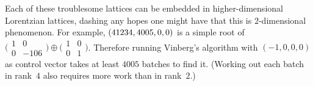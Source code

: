 \documentclass[12pt]{amsart}
\def\twobytwo#1#2#3#4{\bigl(\begin{smallmatrix}#1&#2\\#3&#4\end{smallmatrix}\bigr)
    }
\def\R{\mathbb{R}}
\numberwithin{theorem}{section}
\numberwithin{equation}{section}
\numberwithin{figure}{section}
\theoremstyle{remark}
\begin{document}
Each of these troublesome
lattices can be embedded in higher-dim\-en\-sion\-al
Lorentzian lattices, dashing any hopes one might
have that this is $2$-dimensional phenomenon. 
For example, $(41234,\discretionary{}{}{} 4005,0,0)$
is a simple root of 
$\twobytwo{1}{0}{0}{-106}\oplus\twobytwo{1}{0}{0}{1}$.
Therefore running Vinberg's algorithm
with $(-1,0,0,0)$ as control vector takes at least $4005$ batches
to find it.  (Working out each 
batch in rank~$4$ also requires
more work than in rank~$2$.)

%
%
%
\end{document}
